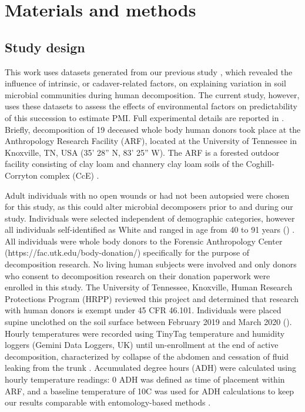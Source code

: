 \documentclass[
  10pt,
  letterpaper,
]{article}
\begin{document}
\section{Materials and methods}\label{materials-and-methods}

\subsection{Study design}\label{study-design}

This work uses datasets generated from our previous study
\citep{mason_body_2022}, which revealed the influence of intrinsic, or
cadaver-related factors, on explaining variation in soil microbial
communities during human decomposition. The current study, however, uses
these datasets to assess the effects of environmental factors on
predictability of this succession to estimate PMI. Full experimental
details are reported in \citep{mason_body_2022}. Briefly, decomposition
of 19 deceased whole body human donors took place at the Anthropology
Research Facility (ARF), located at the University of Tennessee in
Knoxville, TN, USA (35' 28'' N, 83' 25'' W).
The ARF is a forested outdoor facility consisting of clay loam and
channery clay loam soils of the Coghill-Corryton complex (CcE)
\citep{keenan_spatial_2018, damann_potential_2015}.

Adult individuals with no open wounds or had not been autopsied were
chosen for this study, as this could alter microbial decomposers prior
to and during our study. Individuals were selected independent of
demographic categories, however all individuals self-identified as White
and ranged in age from 40 to 91 years ()
\citep{mason_body_2022}. All individuals were whole body donors to the
Forensic Anthropology Center (https://fac.utk.edu/body-donation/)
specifically for the purpose of decomposition research. No living human
subjects were involved and only donors who consent to decomposition
research on their donation paperwork were enrolled in this study. The
University of Tennessee, Knoxville, Human Research Protections Program
(HRPP) reviewed this project and determined that research with human
donors is exempt under 45 CFR 46.101. Individuals were placed supine
unclothed on the soil surface between February 2019 and March 2020
(). Hourly temperatures were recorded using TinyTag
temperature and humidity loggers (Gemini Data Loggers, UK) until
un-enrollment at the end of active decomposition, characterized by
collapse of the abdomen and cessation of fluid leaking from the trunk
\citep{megyesi_using_2005}. Accumulated degree hours (ADH) were
calculated using hourly temperature readings: 0 ADH was defined as time
of placement within ARF, and a baseline temperature of 10\textdegree C
was used for ADH calculations to keep our results comparable with
entomology-based methods \citep{byrd_development_2001}.
\end{document}
